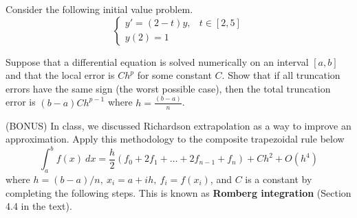 \documentclass[addpoints, 11pt]{exam}
\newcommand{\ds}{\displaystyle}
\begin{document}
\begin{questions}
\question Consider the following initial value problem.
$$
\begin{cases}
y' =(2-t)y, & t \in [2,5] \\
y(2) = 1
\end{cases}
$$

\question Suppose that a differential equation is solved numerically on an interval $[a,b]$ and that the local error is $C h^p$ for some constant $C$. Show that if all truncation errors have the same sign (the worst possible case), then the total truncation error is $(b-a)Ch^{p-1}$ where $h=\frac{(b-a)}{n}$.

\pagebreak

\question(BONUS) In class, we discussed Richardson extrapolation as a way to improve an approximation. Apply this methodology to the composite trapezoidal rule below
$$
\int_a^b f(x)~dx = \frac{h}{2} \left( f_0 + 2f_1 + \dots + 2f_{n-1} + f_n \right) + Ch^2 + O(h^4)
$$
where $h=(b-a)/n,~ x_i = a+ih,~ f_i=f(x_i)$, and $C$ is a constant by completing the following steps. This is known as {\bf Romberg integration} (Section 4.4 in the text).
\begin{parts}

\end{parts}
\end{questions}
\end{document}
